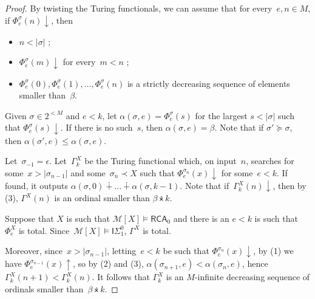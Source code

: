\documentclass{article}
\numberwithin{theorem}{section}
\newcommand{\RCA}{\mathsf{RCA}}
\newcommand{\ISig}{\mathsf{I}\Sigma^0}
\newcommand{\M}{\mathcal{M}}
\newcommand{\nplus}{\dotplus}
\newcommand{\ntimes}{\dottimes}
\begin{document}
\begin{proof}
By twisting the Turing functionals, we can assume that for every~$e, n \in M$, if $\Phi^\sigma_e(n)\downarrow$, then
\begin{itemize}
    \item[(1)] $n < |\sigma|$ ;
    \item[(2)] $\Phi^\sigma_e(m)\downarrow$ for every~$m < n$ ;
    \item[(3)] $\Phi^\sigma_e(0), \Phi^\sigma_e(1), \dots, \Phi^\sigma_e(n)$ is a strictly decreasing sequence of elements smaller than~$\beta$.
\end{itemize}

Given $\sigma \in 2^{<M}$ and $e < k$, let $\alpha(\sigma, e) = \Phi^{\sigma}_e(s)$ for the largest $s < |\sigma|$ such that $\Phi^{\sigma}_e(s)\downarrow$. If there is no such~$s$, then $\alpha(\sigma, e) = \beta$. Note that if $\sigma' \succeq \sigma$, then $\alpha(\sigma',e) \leq \alpha(\sigma,e)$.

Let~$\sigma_{-1} = \epsilon$.
Let~$\Gamma^X_k$ be the Turing functional which, on input~$n$, searches for some~$x > |\sigma_{n-1}|$ and some~$\sigma_n \prec X$ such that $\Phi_e^{\sigma_n}(x)\downarrow$ for some~$e < k$. If found, it outputs $\alpha(\sigma, 0) \nplus \dots \nplus \alpha(\sigma, k-1)$. Note that if~$\Gamma^X_k(n)\downarrow$, then by (3), $\Gamma^X(n)$ is an ordinal smaller than $\beta \ntimes k$.

Suppose that $X$ is such that $\M[X] \models \RCA_0$ and there is an $e < k$ is such that $\Phi_e^X$ is total.
Since~$\M[X] \models \ISig_1$, $\Gamma^X$ is total.

Moreover, since~$x > |\sigma_{n-1}|$, letting~$e < k$ be such that $\Phi_e^{\sigma_n}(x)\downarrow$, by (1) we have $\Phi_e^{\sigma_{n-1}}(x)\uparrow$, so by (2) and (3), $\alpha(\sigma_{n+1},e) < \alpha(\sigma_n, e)$, hence $\Gamma^X_k(n+1) < \Gamma^X_k(n)$. It follows that $\Gamma^X_k$ is an $M$-infinite decreasing sequence of ordinals smaller than~$\beta \ntimes k$.
\end{proof}
\end{document}
